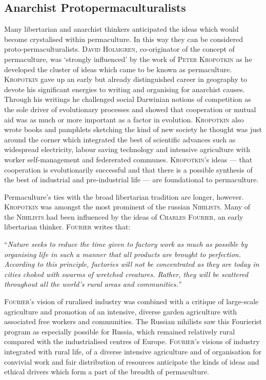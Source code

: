 \documentclass[a4paper, 11pt]{article}
\begin{document}
\begin{multicols*}{2}
\section*{Anarchist Protopermaculturalists}
 Many libertarian and anarchist thinkers anticipated the ideas which would become crystalised within permaculture.  In this way they can be considered proto-permaculturalists. \textsc{David Holmgren}, co-originator of the concept of permaculture, was `strongly influenced' by the work of \textsc{Peter Kropotkin} as he developed the cluster of ideas which came to be known as permaculture.  \textsc{Kropotkin} gave up an early but already distinguished career in geography to devote his significant energies to writing and organising for anarchist causes. Through his writings he challenged social Darwinian notions of competition as the sole driver of evolutionary processes and showed that cooperation or mutual aid was as much or more important as a factor in evolution.  \textsc{Kropotkin} also wrote books and pamphlets sketching the kind of new society he thought was just around the corner which integrated the best of scientific advances such as widespread electricity, labour saving technology and intensive agriculture with worker self-management and federerated communes.  \textsc{Kropotkin}'s ideas --- that cooperation is evolutionarily successful and that there is a possible synthesis of the best of industrial and pre-industrial life --- are foundational to permaculture.

  Permaculture's ties with the broad libertarian tradition are longer, however.  \textsc{Kropotkin} was amongst the most prominent of the russian \textsc{Nihilists}. Many of the \textsc{Nihilists} had been influenced by the ideas of \textsc{Charles Fourier}, an early libertarian thinker. \textsc{Fourier} writes that: 

\vspace{1mm}
``\em{Nature seeks to reduce the time given to factory work as much as possible by organising life in such a manner that all products are brought to perfection.  According to this principle, factories will not be concentrated as they are today in cities choked with swarms of wretched creatures.  Rather, they will be scattered throughout all the world's rural areas and communities.}\em''
\vspace{1mm}

\textsc{Fourier}'s vision of ruralised industry was combined with a critique of large-scale agriculture and promotion of an intensive, diverse garden agriculture with associated free workers and communities.  The Russian nihilists saw this Fourierist program as especially possible for Russia, which remained relatively rural compared with the industrialised centres of Europe.  \textsc{Fourier}'s visions of industry integrated with rural life, of a diverse intensive agriculture and of organisation for convivial work and fair distribution of resources anticipate the kinds of ideas and ethical drivers which form a part of the breadth of permaculture.


\end{multicols*}
\end{document}

